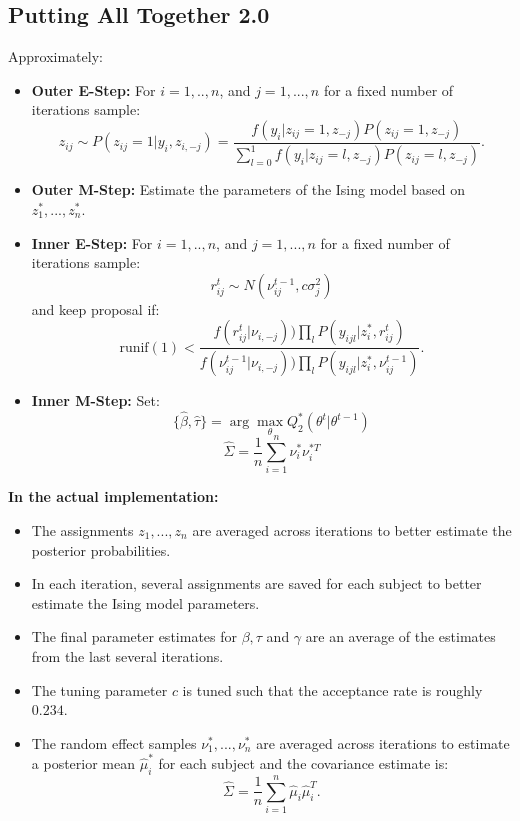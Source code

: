 \documentclass{article}\usepackage[]{graphicx}\usepackage[]{color}
\begin{document}
\subsection{Putting All Together 2.0}
Approximately:
\begin{itemize}
\item \textbf{Outer E-Step:} For $i = 1,..,n$, and $j=1,...,n$ for a fixed number of iterations sample: 
$$
z_{ij} \sim P(z_{ij} = 1 | y_i, z_{i,-j}) = 
\frac{f(y_i | z_{ij} = 1, z_{-j}) P( z_{ij} = 1, z_{-j})}
{\sum_{l=0}^{1} f(y_i | z_{ij} = l, z_{-j}) P( z_{ij} = l, z_{-j})}.
$$

\item \textbf{Outer M-Step:} Estimate the parameters of the Ising model based on $z_1^*,...,z^*_n$. 

\item \textbf{Inner E-Step:} For $i = 1,..,n$, and $j=1,...,n$ for a fixed number of iterations sample: 
$$
r_{ij}^{t} \sim N(\nu_{ij}^{t-1}, c\sigma^{2}_j)
$$
and keep proposal if:
$$
\text{runif}(1) < 
\frac{f(r_{ij}^t | \nu_{i, -j}))\prod_{l} P(y_{ijl} | z_i^*, r_{ij}^{t})}
{f(\nu_{ij}^{t-1} | \nu_{i, -j}))\prod_{l} P(y_{ijl} | z_i^*, \nu_{ij}^{t-1})}.
$$

\item \textbf{Inner M-Step:} Set:
$$
\{\hat\beta, \hat\tau\} = \arg\max_\theta Q_2^*(\theta^{t}|\theta^{t-1})  
$$$$
\hat\Sigma = \frac{1}{n} \sum_{i=1}^{n} \nu_i^* \nu_i^{*T}
$$
\end{itemize}

\textbf{In the actual implementation:}
\begin{itemize}
\item The assignments $z_1,...,z_n$ are averaged across iterations to better estimate the posterior probabilities.
\item In each iteration, several assignments are saved for each subject to better estimate the Ising model parameters.
\item The final parameter estimates for $\beta, \tau$ and $\gamma$ are an average of the estimates from the last several iterations. 
\item The tuning parameter $c$ is tuned such that the acceptance rate is roughly $0.234$.
\item The random effect samples $\nu_1^*,...,\nu_n^*$ are averaged across iterations to estimate a posterior mean $\hat\mu^*_i$ for each subject and the covariance estimate is:
$$
\hat\Sigma = \frac{1}{n} \sum_{i=1}^{n} \hat\mu_i\hat\mu_i^{T}.
$$
\end{itemize}
\end{document}
